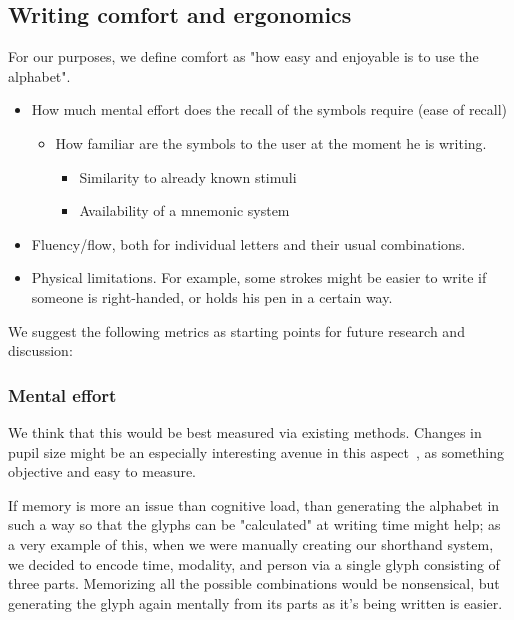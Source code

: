 \documentclass[conference]{IEEEtran}
\begin{document}
\subsection{Writing comfort and ergonomics}
For our purposes, we define comfort as "how easy and enjoyable is to use the alphabet". 
\begin{itemize}
        \item How much mental effort does the recall of the symbols require (ease of recall)
                \begin{itemize}
                        \item How familiar are the symbols to the user at the moment he is writing. 
                                \begin{itemize}
                                        \item Similarity to already known stimuli
                                        \item Availability of a mnemonic system
                                \end{itemize}
                \end{itemize}
        \item Fluency/flow, both for individual letters and their usual combinations.
        \item Physical limitations. For example, some strokes might be easier to write if someone is right-handed, or holds his pen in a certain way.
\end{itemize}

We suggest the following metrics as starting points for future research and discussion:

\subsubsection{Mental effort}
We think that this would be best measured via existing methods. Changes in pupil size might be an especially interesting avenue in this aspect~\cite{Alns2014PupilSS}, as something objective and easy to measure.

If memory is more an issue than cognitive load, than generating the alphabet in such a way so that the glyphs can be "calculated" at writing time might help; as a very example of this, when we were manually creating our shorthand system, we decided to encode 
 time, modality, and person via a single glyph consisting of three parts. Memorizing all the possible combinations would be nonsensical, but generating the glyph again mentally from its parts as it's being written is easier. 
\end{document}
